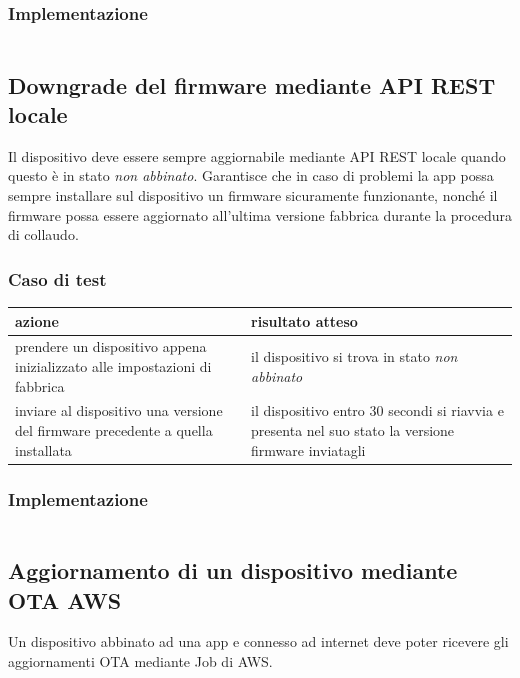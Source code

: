 \documentclass[12pt,a4paper,twoside,titlepage]{book}
\begin{document}
\subsubsection{Implementazione}
\inputminted[]{python3}{src/test_pairing.py}

\subsection{Downgrade del firmware mediante API REST locale}
Il dispositivo deve essere sempre aggiornabile mediante API REST locale quando questo
è in stato \textit{non abbinato}. Garantisce che in caso di problemi la app possa sempre
installare sul dispositivo un firmware sicuramente funzionante, nonché il firmware
possa essere aggiornato all’ultima versione fabbrica durante la procedura di collaudo.

\subsubsection{Caso di test}
\begin{center}
\begin{tabular}{| p{} | p{} |}
    \hline \textbf{azione} & \textbf{risultato atteso} \\
    \hline prendere un dispositivo appena inizializzato alle impostazioni di fabbrica & il dispositivo si trova in stato \textit{non abbinato} \\
    \hline inviare al dispositivo una versione del firmware precedente a quella installata & il dispositivo entro 30 secondi si riavvia e presenta nel suo stato la versione firmware inviatagli \\
    \hline
\end{tabular}
\end{center}

\subsubsection{Implementazione}
\inputminted[]{python3}{src/test_downgrade.py}

\subsection{Aggiornamento di un dispositivo mediante OTA AWS}

Un dispositivo abbinato ad una app e connesso ad internet deve poter ricevere gli
aggiornamenti OTA mediante Job di AWS.
\end{document}
